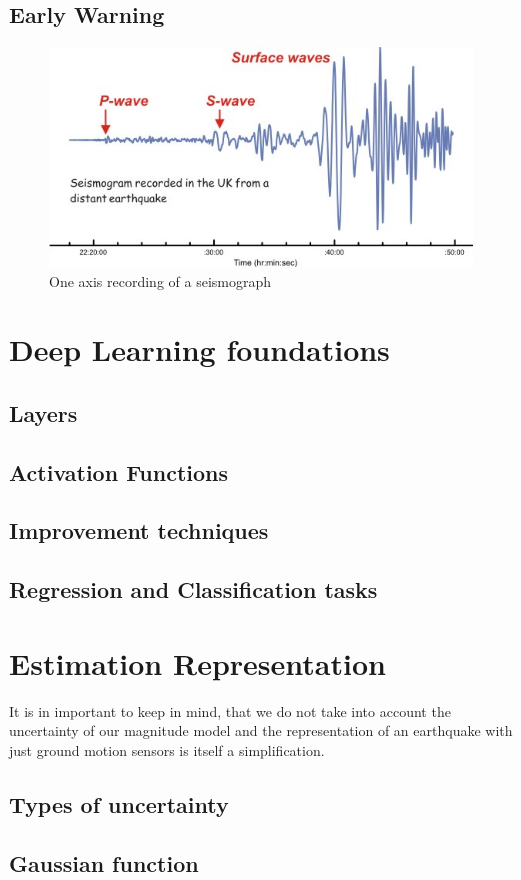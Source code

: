 \documentclass[thesis.tex]{subfiles}
\begin{document}
\subsection{Early Warning}
\begin{figure}[hb]
	\centering
	\includegraphics[width=0.6\linewidth]{../pictures/Prerequisites/dia_seismogram.jpg}
	\caption{One axis recording of a seismograph}
	\label{fig:seismogram}
\end{figure}
\section{Deep Learning foundations}
\subsection{Layers}
\subsection{Activation Functions}
\subsection{Improvement techniques}
\subsection{Regression and Classification tasks}
\section{Estimation Representation} 
 It is in important to keep in mind, that we do not take into account the uncertainty of our magnitude model and the representation of an earthquake with just ground motion sensors is itself a simplification.
\subsection{Types of uncertainty}
\subsection{Gaussian function}




\subfilebib %
\end{document}
